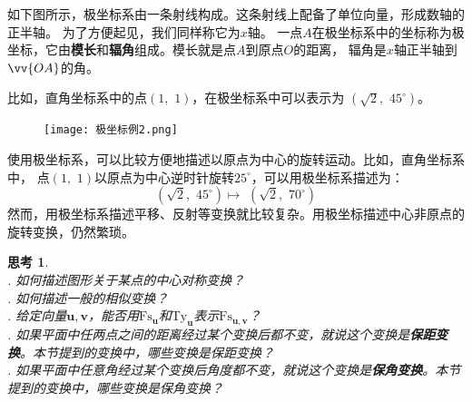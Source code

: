 \documentclass[12pt,UTF8]{ctexbook}
\newtheorem{sk}{思考}[section]
\begin{document}
如下图所示，极坐标系由一条射线构成。这条射线上配备了单位向量，形成数轴的正半轴。
为了方便起见，我们同样称它为$x$轴。
一点$A$在极坐标系中的坐标称为\textnormal{极坐标}，它由\textbf{模长}和\textbf{辐角}组成。模长就是点$A$到原点$O$的距离，
辐角是$x$轴正半轴到$\vv{OA}$的角。

比如，直角坐标系中的点$(1,\,\,1)$，在极坐标系中可以表示为
$\left(\sqrt{2},\,\, 45^\circ\right)$。

\begin{figure}[h] %
    \vspace{4pt}
    \centering
    \texttt{[image: 极坐标例2.png]}
\end{figure}

使用极坐标系，可以比较方便地描述以原点为中心的旋转运动。比如，直角坐标系中，
点$(1,\,\,1)$以原点为中心逆时针旋转$25^\circ$，可以用极坐标系描述为：
$$ \left(\sqrt{2}, \,\, 45^\circ\right) \mapsto \,\, \left(\sqrt{2}, \,\, 70^\circ\right)$$
然而，用极坐标系描述平移、反射等变换就比较复杂。用极坐标描述中心非原点的旋转变换，仍然繁琐。

\begin{sk}
    \mbox{}\\
    . 如何描述图形关于某点的中心对称变换？ \\
    . 如何描述一般的相似变换？\\
    . 给定向量$\mathbf{u}, \mathbf{v}$，能否用$\mathrm{Fs}_{\mathbf{u}}$和$\mathrm{Ty}_{\mathbf{u}}$表示$\mathrm{Fs}_{\mathbf{u}, \mathbf{v}}$？\\
    . 如果平面中任两点之间的距离经过某个变换后都不变，就说这个变换是\textbf{保距变换}。本节提到的变换中，哪些变换是保距变换？\\
    . 如果平面中任意角经过某个变换后角度都不变，就说这个变换是\textbf{保角变换}。本节提到的变换中，哪些变换是保角变换？
\end{sk}
\end{document}
